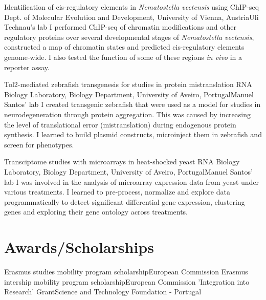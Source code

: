 \documentclass[11pt,a4paper,roman]{moderncv} %
\begin{document}
		{Identification of cis-regulatory elements in \textit{Nematostella vectensis} using ChIP-seq}
		{Dept. of Molecular Evolution and Development, University of Vienna, Austria}{Uli Technau's lab}
		{}
		{I performed ChIP-seq of chromatin modifications and other regulatory proteins over several developmental stages of \textit{Nematostella vectensis}, constructed a map of chromatin states and predicted cis-regulatory elements genome-wide. I also tested the function of some of these regions \textit{in vivo} in a reporter assay.}

		{Tol2-mediated zebrafish transgenesis for studies in protein mistranslation}
		{RNA Biology Laboratory, Biology Department, University of Aveiro, Portugal}{Manuel Santos' lab}
		{}
		{I created transgenic zebrafish that were used as a model for studies in neurodegeneration through protein aggregation. This was caused by increasing the level of translational error (mistranslation) during endogenous protein synthesis. I learned to build plasmid constructs, microinject them in zebrafish and screen for phenotypes.}

		{Transciptome studies with microarrays in heat-shocked yeast}
		{RNA Biology Laboratory, Biology Department, University of Aveiro, Portugal}{Manuel Santos' lab}
		{}
		{I was involved in the analysis of microarray expression data from yeast under various treatments. I learned to pre-process, normalize and explore data programmatically to detect significant differential gene expression, clustering genes and exploring their gene ontology across treatments.}


\section{Awards/Scholarships}

		{Erasmus studies mobility program scholarship}{}{}{}{European Commission}
		{Erasmus intership mobility program scholarship}{}{}{}{European Commission}
		{'Integration into Research' Grant}{}{}{}{Science and Technology Foundation - Portugal}

\end{document}
